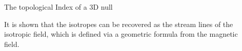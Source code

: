 \documentclass[final]{beamer}
\newlength{\onecolwid}
\newlength{\twocolwid}
\begin{document}
\begin{frame}[t]
\begin{columns}[t]
\begin{column}{\twocolwid}
\begin{columns}[t,totalwidth=\twocolwid]
\begin{column}{\onecolwid}
\begin{block}{The topological Index of a 3D null}
\end{block}It is shown that the isotropes can 
be recovered as the stream lines of the isotropic field, which is defined 
via a geometric formula from the magnetic field.


\end{column} %

\begin{column}{\onecolwid}\vspace{-.6in} %



\end{column}
\end{columns}
\end{column}
\end{columns}
\end{frame}
\end{document}
